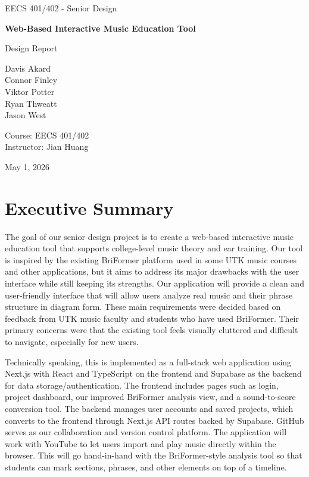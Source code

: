 \documentclass[12pt, letterpaper]{article}
\begin{document}
\begin{titlepage}
    \centering
    {\Large EECS 401/402 - Senior Design \par}
    \vspace{1cm}
    {\huge\bfseries Web-Based Interactive Music Education Tool\par}
    \vspace{1cm}
    {\Large Design Report\par}
    \vfill
    {\large
    Davis Akard \\
    Connor Finley \\
    Viktor Potter \\
    Ryan Thweatt \\
    Jason West\par}
    \vspace{1cm}
    {\large
    Course: EECS 401/402 \\
    Instructor: Jian Huang\par}
    \vfill
    {\large May 1, 2026 \par}
\end{titlepage}

\section*{Executive Summary}
The goal of our senior design project is to create a web-based interactive music education tool that supports college-level music theory and ear training. Our tool is inspired by the existing BriFormer platform used in some UTK music courses and other applications, but it aims to address its major drawbacks with the user interface while still keeping its strengths. Our application will provide a clean and user-friendly interface that will allow users analyze real music and their phrase structure in diagram form. These main requirements were decided based on feedback from UTK music faculty and students who have used BriFormer. Their primary concerns were that the existing tool feels visually cluttered and difficult to navigate, especially for new users.

Technically speaking, this is implemented as a full-stack web application using Next.js with React and TypeScript on the frontend and Supabase as the backend for data storage/authentication. The frontend includes pages such as login, project dashboard, our improved BriFormer analysis view, and a sound-to-score conversion tool. The backend manages user accounts and saved projects, which converts to the frontend through Next.js API routes backed by Supabase. GitHub serves as our collaboration and version control platform. The application will work with YouTube to let users import and play music directly within the browser. This will go hand-in-hand with the BriFormer-style analysis tool so that students can mark sections, phrases, and other elements on top of a timeline.
\end{document}
